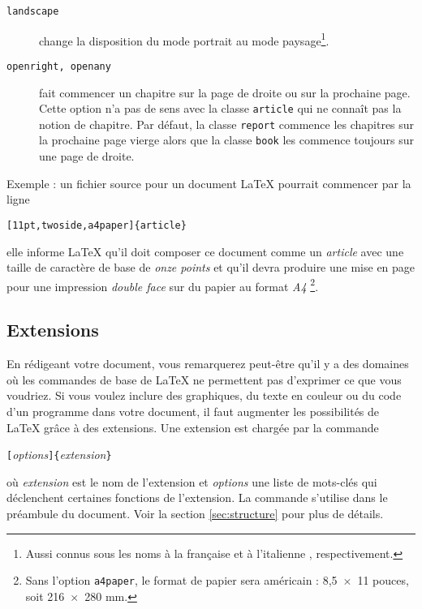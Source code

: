 \begin{table}[!bp]
\begin{lined}{\textwidth}
\begin{flushleft}
\begin{description}
\item[\normalfont\texttt{landscape}] \quad change la disposition du
mode portrait au mode paysage\footnote{Aussi connus sous les noms \og
  à la française \fg{} et \og à l'italienne \fg{}, respectivement. \NdT}.

\item[\normalfont\texttt{openright, openany}] \quad fait commencer un
chapitre sur la page de droite ou sur la prochaine page. Cette option
n'a pas de sens avec la classe \texttt{article} qui ne connaît pas la
notion de chapitre. Par défaut, la classe \texttt{report} commence les
chapitres sur la prochaine page vierge alors que la classe
\texttt{book} les commence toujours sur une page de droite.

\end{description}
\end{flushleft}
\end{lined}
\end{table}

Exemple : un fichier source pour un document \LaTeX{} pourrait
commencer par la ligne
\begin{code}
\verb|[11pt,twoside,a4paper]{article}|
\end{code}
elle informe \LaTeX{} qu'il doit composer ce document comme un
\emph{article} avec une taille de caractère de base de \emph{onze
points} et qu'il devra produire une mise en page pour une impression
\emph{double face} sur du papier au format \emph{A4}%
\footnote{Sans l'option \texttt{a4paper}, le format de papier sera
américain : 8,5~$\times$~11 pouces, soit 216~$\times$~280 mm.}.
\pagebreak[2]

\subsection{Extensions}
En rédigeant votre document, vous remarquerez peut-être qu'il y a des
domaines où les commandes de base de \LaTeX{} ne permettent pas
d'exprimer ce que vous voudriez. Si vous voulez inclure des
graphiques, du texte en couleur ou du code d'un programme dans votre
document, il faut augmenter les possibilités de \LaTeX{} grâce à des
extensions.
Une extension est chargée par la commande
\begin{lscommand}
\verb|[|\emph{options}\verb|]{|\emph{extension}\verb|}|
\end{lscommand}
où \emph{extension} est le nom de l'extension et \emph{options} une liste
de mots-clés qui déclenchent certaines fonctions de
l'extension. La commande  s'utilise dans le préambule
du document. Voir la section \ref{sec:structure} pour plus de détails.

